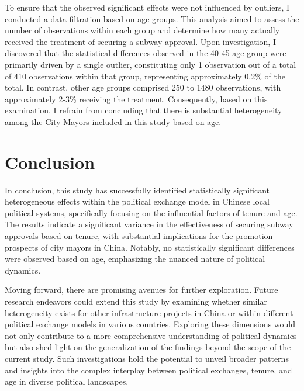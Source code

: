 \documentclass[12pt, ]{article}
\newenvironment{CSLReferences}[2]{

\clearpage
}{}
\begin{document}
To ensure that the observed significant effects were not influenced by
outliers, I conducted a data filtration based on age groups. This
analysis aimed to assess the number of observations within each group
and determine how many actually received the treatment of securing a
subway approval. Upon investigation, I discovered that the statistical
differences observed in the 40-45 age group were primarily driven by a
single outlier, constituting only 1 observation out of a total of 410
observations within that group, representing approximately 0.2\% of the
total. In contrast, other age groups comprised 250 to 1480 observations,
with approximately 2-3\% receiving the treatment. Consequently, based on
this examination, I refrain from concluding that there is substantial
heterogeneity among the City Mayors included in this study based on age.

\hypertarget{conclusion}{%
\section{Conclusion}\label{conclusion}}

In conclusion, this study has successfully identified statistically
significant heterogeneous effects within the political exchange model in
Chinese local political systems, specifically focusing on the
influential factors of tenure and age. The results indicate a
significant variance in the effectiveness of securing subway approvals
based on tenure, with substantial implications for the promotion
prospects of city mayors in China. Notably, no statistically significant
differences were observed based on age, emphasizing the nuanced nature
of political dynamics.

Moving forward, there are promising avenues for further exploration.
Future research endeavors could extend this study by examining whether
similar heterogeneity exists for other infrastructure projects in China
or within different political exchange models in various countries.
Exploring these dimensions would not only contribute to a more
comprehensive understanding of political dynamics but also shed light on
the generalization of the findings beyond the scope of the current
study. Such investigations hold the potential to unveil broader patterns
and insights into the complex interplay between political exchanges,
tenure, and age in diverse political landscapes.

\newpage{}

\hypertarget{refs}{}

\begin{CSLReferences}{0}{0}\end{CSLReferences}


\end{document}
